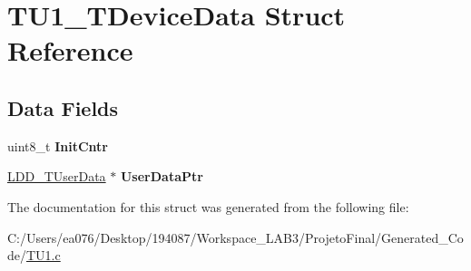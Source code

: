 \hypertarget{struct_t_u1___t_device_data}{\section{T\-U1\-\_\-\-T\-Device\-Data Struct Reference}
\label{struct_t_u1___t_device_data}
}
\subsection*{Data Fields}
\begin{DoxyCompactItemize}
\item 
\hypertarget{struct_t_u1___t_device_data_a6f7812497a6a66d8ce0baace72a4a0c6}{uint8\-\_\-t {\bfseries Init\-Cntr}}\label{struct_t_u1___t_device_data_a6f7812497a6a66d8ce0baace72a4a0c6}

\item 
\hypertarget{struct_t_u1___t_device_data_a3998052c6674b750711c4ce24df0a417}{\hyperlink{group___p_e___types__module_ga0b66a73f87238a782318aa0be7578e35}{L\-D\-D\-\_\-\-T\-User\-Data} $\ast$ {\bfseries User\-Data\-Ptr}}\label{struct_t_u1___t_device_data_a3998052c6674b750711c4ce24df0a417}

\end{DoxyCompactItemize}


The documentation for this struct was generated from the following file\-:\begin{DoxyCompactItemize}
\item 
C\-:/\-Users/ea076/\-Desktop/194087/\-Workspace\-\_\-\-L\-A\-B3/\-Projeto\-Final/\-Generated\-\_\-\-Code/\hyperlink{_t_u1_8c}{T\-U1.\-c}\end{DoxyCompactItemize}
